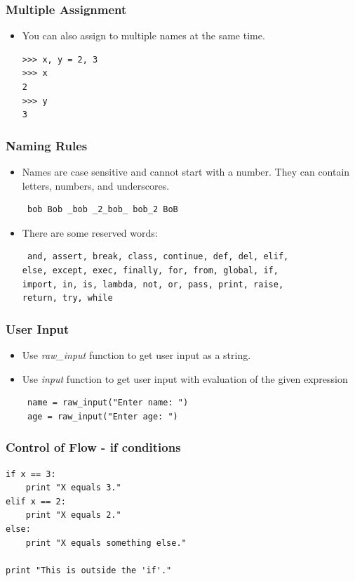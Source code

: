 \documentclass[12pt,handout]{beamer}
\begin{document}
\begin{frame}[fragile]
\frametitle{Multiple Assignment}

\begin{itemize}
\item You can also assign to multiple names at the same time.
\small{
\begin{verbatim}
>>> x, y = 2, 3
>>> x
2
>>> y
3
\end{verbatim}
}
\end{itemize}
\end{frame}

\begin{frame}[fragile]
\frametitle{Naming Rules}

\begin{itemize}
\item Names are case sensitive and cannot start with a number.
They can contain letters, numbers, and underscores.\\
\small{
\begin{verbatim}
 bob Bob _bob _2_bob_ bob_2 BoB
\end{verbatim}
}
\item There are some reserved words:\\
\small{
\begin{verbatim}
 and, assert, break, class, continue, def, del, elif,
else, except, exec, finally, for, from, global, if,
import, in, is, lambda, not, or, pass, print, raise,
return, try, while
\end{verbatim}
}
\end{itemize}
\end{frame}

\begin{frame}[fragile]
\frametitle{User Input}

\begin{itemize}
\item Use {\it raw\_input} function to get user input as a string.
\item Use {\it input} function to get user input with evaluation
of the given expression
\small{
\begin{verbatim}
 name = raw_input("Enter name: ")
 age = raw_input("Enter age: ")
\end{verbatim}
}
\end{itemize}
\end{frame}

\begin{frame}[fragile]
\frametitle{Control of Flow - if conditions}
\small{
\begin{verbatim}
if x == 3:
    print "X equals 3."
elif x == 2:
    print "X equals 2."
else:
    print "X equals something else."

print "This is outside the 'if'."

\end{verbatim}
}
\end{frame}
\end{document}
